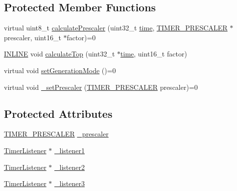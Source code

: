 \subsection*{Protected Member Functions}
\begin{DoxyCompactItemize}
\item 
virtual uint8\-\_\-t \hyperlink{classmhvlib_1_1_timer_a664e4ccc8c1b8bafa5fbbaf1f190787b}{calculate\-Prescaler} (uint32\-\_\-t \hyperlink{structmhvlib_1_1time}{time}, \hyperlink{namespacemhvlib_ae280d2a7103fc576dbd0e8880c574e6c}{T\-I\-M\-E\-R\-\_\-\-P\-R\-E\-S\-C\-A\-L\-E\-R} $\ast$prescaler, uint16\-\_\-t $\ast$factor)=0
\item 
\hyperlink{io_8h_a2eb6f9e0395b47b8d5e3eeae4fe0c116}{I\-N\-L\-I\-N\-E} void \hyperlink{classmhvlib_1_1_timer_a65f0b7887c8293769a7b9c8f45707cde}{calculate\-Top} (uint32\-\_\-t $\ast$\hyperlink{structmhvlib_1_1time}{time}, uint16\-\_\-t factor)
\item 
virtual void \hyperlink{classmhvlib_1_1_timer_accaaf4d01a6b67edc209481dc009963c}{set\-Generation\-Mode} ()=0
\item 
virtual void \hyperlink{classmhvlib_1_1_timer_aeec0e358acaee963e167bad8c8fba294}{\-\_\-set\-Prescaler} (\hyperlink{namespacemhvlib_ae280d2a7103fc576dbd0e8880c574e6c}{T\-I\-M\-E\-R\-\_\-\-P\-R\-E\-S\-C\-A\-L\-E\-R} prescaler)=0
\end{DoxyCompactItemize}
\subsection*{Protected Attributes}
\begin{DoxyCompactItemize}
\item 
\hyperlink{namespacemhvlib_ae280d2a7103fc576dbd0e8880c574e6c}{T\-I\-M\-E\-R\-\_\-\-P\-R\-E\-S\-C\-A\-L\-E\-R} \hyperlink{classmhvlib_1_1_timer_a966e0dbbf5f9e7b784ee99d737cb4dcc}{\-\_\-prescaler}
\item 
\hyperlink{classmhvlib_1_1_timer_listener}{Timer\-Listener} $\ast$ \hyperlink{classmhvlib_1_1_timer_a4101a5f1852ba1706390fc8c621106e3}{\-\_\-listener1}
\item 
\hyperlink{classmhvlib_1_1_timer_listener}{Timer\-Listener} $\ast$ \hyperlink{classmhvlib_1_1_timer_a6fa6caed544d2afd4cd2be8a41ff7b60}{\-\_\-listener2}
\item 
\hyperlink{classmhvlib_1_1_timer_listener}{Timer\-Listener} $\ast$ \hyperlink{classmhvlib_1_1_timer_a364df7367363b6e87e383e72c3660b6b}{\-\_\-listener3}
\end{DoxyCompactItemize}


